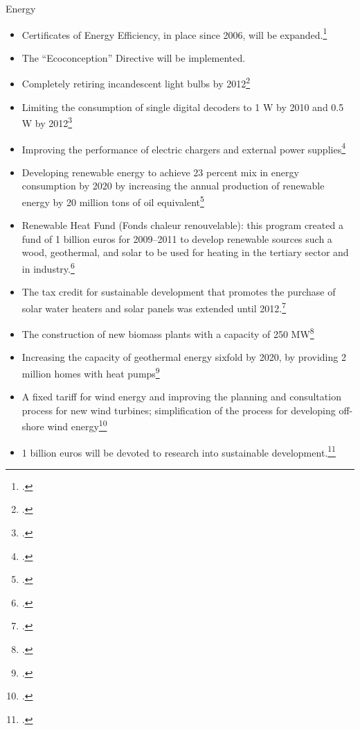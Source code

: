\documentclass[10pt]{article}
\begin{document}
Energy
\begin{itemize}
	\item Certificates of Energy Efficiency, in place since 2006, will be expanded.\footcite[][]{GrenellePolicies}
	\item The ``Ecoconception'' Directive will be implemented.
	\item Completely retiring incandescent light bulbs by 2012\footcite[][]{GrenellePolicies}
	\item Limiting the consumption of single digital decoders to 1 W by 2010 and 0.5 W by 2012\footcite[][]{GrenellePolicies}
	\item Improving the performance of electric chargers and external power supplies\footcite[][]{GrenellePolicies}
	\item Developing renewable energy to achieve 23 percent mix in energy consumption by 2020 by increasing the annual production of renewable energy by 20 million tons of oil equivalent\footcite[][]{GrenellePolicies}
	\item Renewable Heat Fund (Fonds chaleur renouvelable): this program created a fund of 1 billion euros for 2009--2011 to develop renewable sources such a wood, geothermal, and solar to be used for heating in the tertiary sector and in industry.\footcite[][]{GrenellePolicies}
	\item The tax credit for sustainable development that promotes the purchase of solar water heaters and solar panels was extended until 2012.\footcite[][]{GrenellePolicies}
	\item The construction of new biomass plants with a capacity of 250 MW\footcite[][]{GrenellePolicies}
	\item Increasing the capacity of geothermal energy sixfold by 2020, by providing 2 million homes with heat pumps\footcite[][]{GrenellePolicies}
	\item A fixed tariff for wind energy and improving the planning and consultation process for new wind turbines; simplification of the process for developing off-shore wind energy\footcite[][]{GrenellePolicies}
	\item 1 billion euros will be devoted to research into sustainable development.\footcite[][]{GrenellePolicies} 
\end{itemize}
\end{document}
